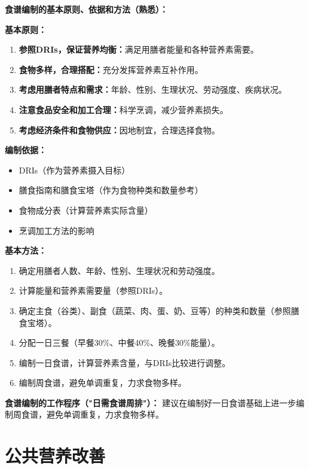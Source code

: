 \begin{defbox}
\textbf{食谱编制的基本原则、依据和方法（熟悉）：}

\textbf{基本原则：}
\begin{enumerate}[leftmargin=*]
    \item \textbf{参照DRIs，保证营养均衡：}满足用膳者能量和各种营养素需要。
    \item \textbf{食物多样，合理搭配：}充分发挥营养素互补作用。
    \item \textbf{考虑用膳者特点和需求：}年龄、性别、生理状况、劳动强度、疾病状况。
    \item \textbf{注意食品安全和加工合理：}科学烹调，减少营养素损失。
    \item \textbf{考虑经济条件和食物供应：}因地制宜，合理选择食物。
\end{enumerate}

\textbf{编制依据：}
\begin{itemize}[leftmargin=*]
    \item DRIs（作为营养素摄入目标）
    \item 膳食指南和膳食宝塔（作为食物种类和数量参考）
    \item 食物成分表（计算营养素实际含量）
    \item 烹调加工方法的影响
\end{itemize}

\textbf{基本方法：}
\begin{enumerate}[leftmargin=*]
    \item 确定用膳者人数、年龄、性别、生理状况和劳动强度。
    \item 计算能量和营养素需要量（参照DRIs）。
    \item 确定主食（谷类）、副食（蔬菜、肉、蛋、奶、豆等）的种类和数量（参照膳食宝塔）。
    \item 分配一日三餐（早餐30\%、中餐40\%、晚餐30\%能量）。
    \item 编制一日食谱，计算营养素含量，与DRIs比较进行调整。
    \item 编制周食谱，避免单调重复，力求食物多样。
\end{enumerate}

\textbf{食谱编制的工作程序（"日需食谱周排"）：}%
建议在编制好一日食谱基础上进一步编制周食谱，避免单调重复，力求食物多样。
\end{defbox}

\section{公共营养改善}

